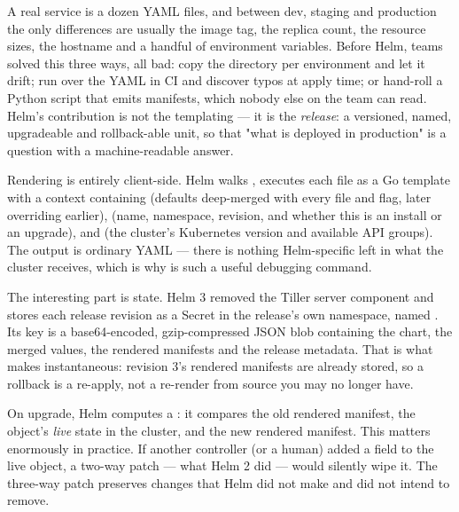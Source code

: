  A real service is a dozen YAML files, and between dev, staging and production the only differences are usually the image tag, the replica count, the resource sizes, the hostname and a handful of environment variables. Before Helm, teams solved this three ways, all bad: copy the directory per environment and let it drift; run  over the YAML in CI and discover typos at apply time; or hand-roll a Python script that emits manifests, which nobody else on the team can read. Helm's contribution is not the templating --- it is the \emph{release}: a versioned, named, upgradeable and rollback-able unit, so that "what is deployed in production" is a question with a machine-readable answer.

 Rendering is entirely client-side. Helm walks , executes each file as a Go template with a context containing  (defaults deep-merged with every  file and  flag, later overriding earlier),  (name, namespace, revision, and whether this is an install or an upgrade),  and  (the cluster's Kubernetes version and available API groups). The output is ordinary YAML --- there is nothing Helm-specific left in what the cluster receives, which is why  is such a useful debugging command.

The interesting part is state. Helm 3 removed the Tiller server component and stores each release revision as a Secret in the release's own namespace, named . Its  key is a base64-encoded, gzip-compressed JSON blob containing the chart, the merged values, the rendered manifests and the release metadata. That is what makes  instantaneous: revision 3's rendered manifests are already stored, so a rollback is a re-apply, not a re-render from source you may no longer have.

On upgrade, Helm computes a : it compares the old rendered manifest, the object's \emph{live} state in the cluster, and the new rendered manifest. This matters enormously in practice. If another controller (or a human) added a field to the live object, a two-way patch --- what Helm 2 did --- would silently wipe it. The three-way patch preserves changes that Helm did not make and did not intend to remove.

